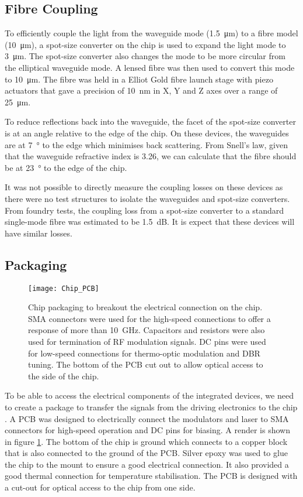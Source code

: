 \subsection{Fibre Coupling}

To efficiently couple the light from the waveguide mode (\SI{1.5}{\um}) to a fibre model (\SI{10}{\micro\metre}), a spot-size converter on the chip is used to expand the light mode to \SI{3}{\micro\meter}. The spot-size converter also changes the mode to be more circular from the elliptical waveguide mode. A lensed fibre was then used to convert this mode to \SI{10}{\micro\meter}. The fibre was held in a Elliot Gold fibre launch stage with piezo actuators that gave a precision of \SI{10}{\nm} in X, Y and Z axes over a range of \SI{25}{\micro\meter}.

To reduce reflections back into the waveguide, the facet of the spot-size converter is at an angle relative to the edge of the chip. On these devices, the waveguides are at \SI{7}{\degree} to the edge which minimises back scattering. From Snell's law, given that the waveguide refractive index is 3.26, we can calculate that the fibre should be at \SI{23}{\degree} to the edge of the chip.

It was not possible to directly measure the coupling losses on these devices as there were no test structures to isolate the waveguides and spot-size converters. From foundry tests, the coupling loss from a spot-size converter to a standard single-mode fibre was estimated to be \SI{1.5}{dB}. It is expect that these devices will have similar losses.

\subsection{Packaging}

\begin{figure}[tp]
	\centering
	\texttt{[image: Chip\_PCB]}
	\caption[Transmitter PCB package]{Chip packaging to breakout the electrical connection on the chip. SMA connectors were used for the high-speed connections to offer a response of more than \SI{10}{\GHz}. Capacitors and resistors were also used for termination of RF modulation signals. DC pins were used for low-speed connections for thermo-optic modulation and \ac{DBR} tuning. The bottom of the PCB cut out to allow optical access to the side of the chip.}
	\label{fig:chip_pcb}
\end{figure}

To be able to access the electrical components of the integrated devices, we need to create a package to transfer the signals from the driving electronics to the chip . A PCB was designed to electrically connect the modulators and laser to SMA connectors for high-speed operation and DC pins for biasing. A render is shown in figure \ref{fig:chip_pcb}. The bottom of the chip is ground which connects to a copper block that is also connected to the ground of the PCB. Silver epoxy was used to glue the chip to the mount to ensure a good electrical connection. It also provided a good thermal connection for temperature stabilisation. The PCB is designed with a cut-out for optical access to the chip from one side.

